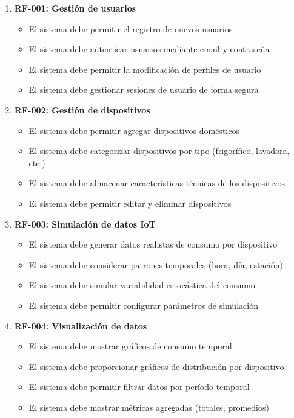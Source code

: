 \begin{enumerate}
    \item \textbf{RF-001: Gestión de usuarios}
    \begin{itemize}
        \item El sistema debe permitir el registro de nuevos usuarios
        \item El sistema debe autenticar usuarios mediante email y contraseña
        \item El sistema debe permitir la modificación de perfiles de usuario
        \item El sistema debe gestionar sesiones de usuario de forma segura
    \end{itemize}
    
    \item \textbf{RF-002: Gestión de dispositivos}
    \begin{itemize}
        \item El sistema debe permitir agregar dispositivos domésticos
        \item El sistema debe categorizar dispositivos por tipo (frigorífico, lavadora, etc.)
        \item El sistema debe almacenar características técnicas de los dispositivos
        \item El sistema debe permitir editar y eliminar dispositivos
    \end{itemize}
    
    \item \textbf{RF-003: Simulación de datos IoT}
    \begin{itemize}
        \item El sistema debe generar datos realistas de consumo por dispositivo
        \item El sistema debe considerar patrones temporales (hora, día, estación)
        \item El sistema debe simular variabilidad estocástica del consumo
        \item El sistema debe permitir configurar parámetros de simulación
    \end{itemize}
    
    \item \textbf{RF-004: Visualización de datos}
    \begin{itemize}
        \item El sistema debe mostrar gráficos de consumo temporal
        \item El sistema debe proporcionar gráficos de distribución por dispositivo
        \item El sistema debe permitir filtrar datos por período temporal
        \item El sistema debe mostrar métricas agregadas (totales, promedios)
    \end{itemize}
    

\end{enumerate}
